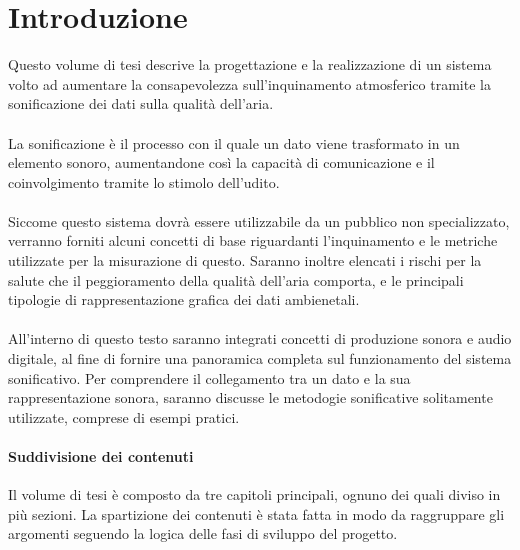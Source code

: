 %
\chapter*{Introduzione}                 %
Questo volume di tesi descrive la progettazione e la realizzazione di un sistema volto ad aumentare la consapevolezza sull'inquinamento atmosferico tramite la sonificazione dei dati sulla qualità dell'aria.
\\\\
La sonificazione è il processo con il quale un dato viene trasformato in un elemento sonoro, aumentandone così la capacità di comunicazione e il coinvolgimento tramite lo stimolo dell'udito.
\\\\
Siccome questo sistema dovrà essere utilizzabile da un pubblico non specializzato, verranno forniti alcuni concetti di base riguardanti l'inquinamento e le metriche utilizzate per la misurazione di questo.
Saranno inoltre elencati i rischi per la salute che il peggioramento della qualità dell'aria comporta, e le principali tipologie di rappresentazione grafica dei dati ambienetali.
\\\\
All'interno di questo testo saranno integrati concetti di produzione sonora e audio digitale, al fine di fornire una panoramica completa sul funzionamento del sistema sonificativo.
Per comprendere il collegamento tra un dato e la sua rappresentazione sonora, saranno discusse le metodogie sonificative solitamente utilizzate, comprese di esempi pratici.

\newpage

\subsubsection{Suddivisione dei contenuti}
Il volume di tesi è composto da tre capitoli principali, ognuno dei quali diviso in più sezioni.
La spartizione dei contenuti è stata fatta in modo da raggruppare gli argomenti seguendo la logica delle fasi di sviluppo del progetto.

